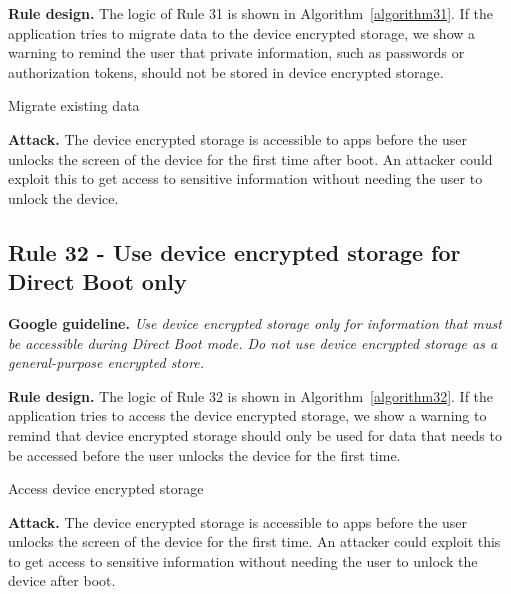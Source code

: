 \textbf{Rule design.} The logic of Rule 31 is shown in Algorithm~\ref{algorithm31}. If the application tries to migrate data to the device encrypted storage, we show a warning to remind the user that private information, such as passwords or authorization tokens, should not be stored in device encrypted storage. 

\setcounter{algocf}{30}
\begin{algorithm}[]
\SetAlgoLined
{}
\caption{Migrate existing data}
\label{algorithm31}
\end{algorithm}

\textbf{Attack.} The device encrypted storage is accessible to apps before the user unlocks the screen of the device for the first time after boot. An attacker could exploit this to get access to sensitive information without needing the user to unlock the device.
\subsection{Rule 32 - Use device encrypted storage for Direct Boot only} 
\textbf{Google guideline.} \emph{Use device encrypted storage only for information that must be accessible during Direct Boot mode. Do not use device encrypted storage as a general-purpose encrypted store.}

\textbf{Rule design.} The logic of Rule 32 is shown in Algorithm~\ref{algorithm32}. If the application tries to access the device encrypted storage, we show a warning to remind that device encrypted storage should only be used for data that needs to be accessed before the user unlocks the device for the first time. 

\setcounter{algocf}{31}
\begin{algorithm}[]
\SetAlgoLined
{}
\caption{Access device encrypted storage}
\label{algorithm32}
\end{algorithm}

\textbf{Attack.} The device encrypted storage is accessible to apps before the user unlocks the screen of the device for the first time. An attacker could exploit this to get access to sensitive information without needing the user to unlock the device after boot.
\newpage
